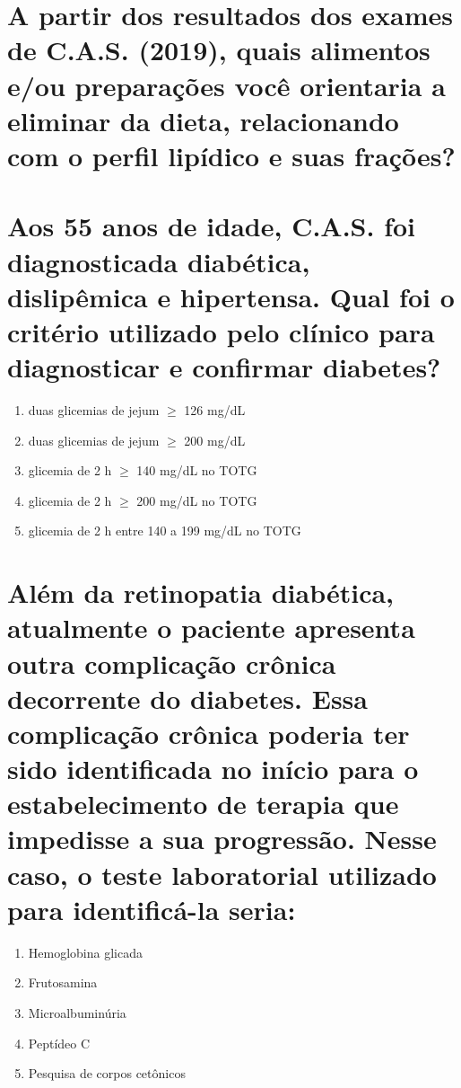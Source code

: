 \documentclass[11pt,notitlepage]{article}
\begin{document}
\section{A partir dos resultados dos exames de C.A.S. (2019), quais alimentos e/ou preparações você orientaria a eliminar da dieta, relacionando com o perfil lipídico e suas frações? }
\noindent\makebox[\linewidth]{\rule{\textwidth}{0.5pt}}
\noindent\makebox[\linewidth]{\rule{\textwidth}{0.5pt}}
\noindent\makebox[\linewidth]{\rule{\textwidth}{0.5pt}}
\noindent\makebox[\linewidth]{\rule{\textwidth}{0.5pt}}
\vspace{0.5cm}

\section{Aos 55 anos de idade, C.A.S. foi diagnosticada diabética, dislipêmica e hipertensa. Qual foi o critério utilizado pelo clínico para diagnosticar e confirmar diabetes? }
\begin{multicols}{2}
	\setlength{\columnseprule}{0pt}
	\begin{enumerate}[label=(\alph*)]
		\item duas glicemias de jejum $\geqslant$ 126 mg/dL
		\item duas glicemias de jejum $\geqslant$ 200 mg/dL
		\item glicemia de 2 h $\geqslant$ 140 mg/dL no TOTG
		\item glicemia de 2 h $\geqslant$ 200 mg/dL no TOTG
		\item glicemia de 2 h entre 140 a 199 mg/dL no TOTG
	\end{enumerate}
\end{multicols}
\vspace{0.5cm}

\section{Além da retinopatia diabética, atualmente o paciente apresenta outra complicação crônica decorrente do diabetes. Essa complicação crônica poderia ter sido identificada no início para o estabelecimento de terapia que impedisse a sua progressão. Nesse caso, o teste laboratorial utilizado para identificá-la seria:}
\begin{multicols}{2}
	\setlength{\columnseprule}{0pt}
	\begin{enumerate}[label=(\alph*)]
		\item Hemoglobina glicada
		\item Frutosamina
		\item Microalbuminúria
		\item Peptídeo C
		\item Pesquisa de corpos cetônicos
	\end{enumerate}
\end{multicols}
\vspace{0.5cm}
\end{document}

